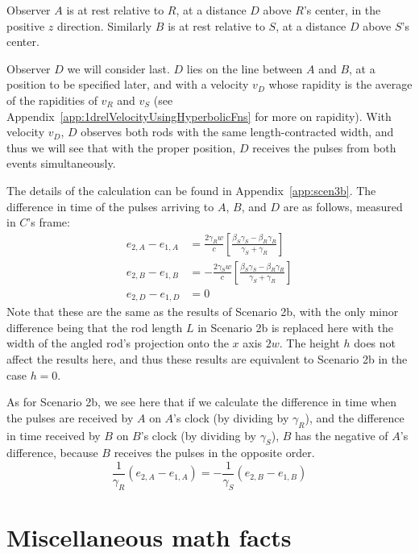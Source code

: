 \documentclass[a4paper]{article}
\theoremstyle{plain}
\theoremstyle{definition}
\begin{document}
Observer $A$ is at rest relative to $R$, at a distance $D$ above $R$'s
center, in the positive $z$ direction.  Similarly $B$ is at rest
relative to $S$, at a distance $D$ above $S$'s center.

Observer $D$ we will consider last.  $D$ lies on the line between $A$
and $B$, at a position to be specified later, and with a velocity
$v_D$ whose rapidity is the average of the rapidities of $v_R$ and
$v_S$ (see Appendix~\ref{app:1drelVelocityUsingHyperbolicFns} for more
on rapidity).  With velocity $v_D$, $D$ observes both rods with the
same length-contracted width, and thus we will see that with the
proper position, $D$ receives the pulses from both events
simultaneously.

The details of the calculation can be found in
Appendix~\ref{app:scen3b}.  The difference in time of the pulses
arriving to $A$, $B$, and $D$ are as follows, measured in $C$'s frame:
\begin{align}
e_{2,A} - e_{1,A}
  & = \frac{2\gamma_R w}{c} \left[ \frac{\beta_S\gamma_S - \beta_R\gamma_R}{\gamma_S + \gamma_R} \right] \label{eqn:scen3b-receiverA} \\
e_{2,B} - e_{1,B}
  & = -\frac{2\gamma_S w}{c} \left[ \frac{\beta_S\gamma_S - \beta_R\gamma_R}{\gamma_S + \gamma_R} \right] \label{eqn:scen3b-receiverB} \\
e_{2,D} - e_{1,D} & = 0 \nonumber
\end{align}
Note that these are the same as the results of Scenario 2b, with the
only minor difference being that the rod length $L$ in Scenario 2b is
replaced here with the width of the angled rod's projection onto the
$x$ axis $2w$.  The height $h$ does not affect the results here, and
thus these results are equivalent to Scenario 2b in the case $h=0$.

As for Scenario 2b, we see here that if we calculate the difference in
time when the pulses are received by $A$ on $A$'s clock (by dividing
by $\gamma_R$), and the difference in time received by $B$ on $B$'s
clock (by dividing by $\gamma_S$), $B$ has the negative of $A$'s
difference, because $B$ receives the pulses in the opposite order.
\begin{equation}
\frac{1}{\gamma_R} (e_{2,A}-e_{1,A}) = - \frac{1}{\gamma_S} (e_{2,B}-e_{1,B})
\end{equation}




\appendix

\section{Miscellaneous math facts}
\end{document}
